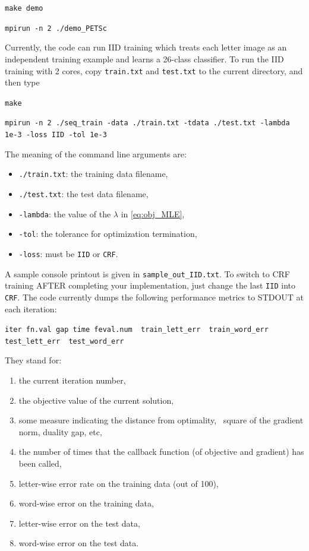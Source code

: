 \documentclass[11pt]{report}
\begin{document}
\verb!make demo!

\vspace{-0.5em}
\verb!mpirun -n 2 ./demo_PETSc!

Currently, the code can run IID training which
treats each letter image as an independent training example and learns a 26-class classifier.
To run the IID training with 2 cores, copy \verb!train.txt! and \verb!test.txt! to the current directory,
and then type

\verb!make!

\vspace{-0.5em}
{\small
\verb!mpirun -n 2 ./seq_train -data ./train.txt -tdata ./test.txt -lambda 1e-3 -loss IID -tol 1e-3!
}
\vspace{-1em}

The meaning of the command line arguments are:

\vspace{-1em}
\begin{itemize}[itemsep=0mm]
  \item \verb!./train.txt!: the training data filename,
  \item \verb!./test.txt!: the test data filename,
  \item \verb!-lambda!: the value of the $\lambda$ in \eqref{eq:obj_MLE},
  \item \verb!-tol!: the tolerance for optimization termination,
  \item \verb!-loss!: must be \verb!IID! or \verb!CRF!.
\end{itemize}
\vspace{-1em}

A sample console printout is given in \verb!sample_out_IID.txt!.
To switch to CRF training AFTER completing your implementation,
just change the last \verb!IID! into \verb!CRF!.
The code currently dumps the following performance metrics to STDOUT at each iteration:

{\small
\verb!iter fn.val gap time feval.num  train_lett_err  train_word_err  test_lett_err  test_word_err!
}

\vspace{-1em}
They stand for:
\vspace{-1em}
\begin{enumerate}[itemsep=0mm]
  \item the current iteration number,
  \item the objective value of the current solution,
  \item some measure indicating the distance from optimality, \eg\ square of the gradient norm, duality gap, etc,
  \item the number of times that the callback function (of objective and gradient) has been called,
  \item letter-wise error rate on the training data (out of 100),
  \item word-wise error on the training data,
  \item letter-wise error on the test data,
  \item word-wise error on the test data.
\end{enumerate}
\end{document}
